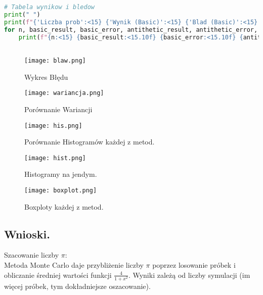 \documentclass[12pt,letterpaper]{article}
\theoremstyle{definition}
\begin{document}
\begin{lstlisting}[language=Python, caption=Skrypt do Zad 3.]
# Tabela wynikow i bledow
print(" ")
print(f"{'Liczba prob':<15} {'Wynik (Basic)':<15} {'Blad (Basic)':<15} {'Wynik (Antithetic)':<20} {'Blad (Antithetic)':<20} {'Wynik (Control Variate)':<25} {'Blad (Control Variate)':<25}")
for n, basic_result, basic_error, antithetic_result, antithetic_error, control_variate_result, control_variate_error in zip(n_values, basic_results, basic_errors, antithetic_results, antithetic_errors, control_variate_results, control_variate_errors):
    print(f"{n:<15} {basic_result:<15.10f} {basic_error:<15.10f} {antithetic_result:<20.10f} {antithetic_error:<20.10f} {control_variate_result:<25.10f} {control_variate_error:<25.10f}")



\end{lstlisting}

\begin{figure}[H]
			\centering

				\centering
				\texttt{[image: blaw.png]}
				\caption{Wykres Błędu}
				\label{fig:zdjecie1}
			\hfill
		\end{figure}
  
\begin{figure}[H]
			\centering

				\centering
				\texttt{[image: wariancja.png]}
				\caption{Porównanie Wariancji}
				\label{fig:zdjecie1}
			\hfill
		\end{figure}

\begin{figure}[H]
			\centering

				\centering
				\texttt{[image: his.png]}
				\caption{Porównanie Histogramów każdej z metod.}
				\label{fig:zdjecie1}
			\hfill
		\end{figure}
\begin{figure}[H]
			\centering

				\centering
				\texttt{[image: hist.png]}
				\caption{Histogramy na jendym.}
				\label{fig:zdjecie1}
			\hfill
		\end{figure}
\begin{figure}[H]
			\centering

				\centering
				\texttt{[image: boxplot.png]}
				\caption{Boxploty każdej z metod.}
				\label{fig:zdjecie1}
			\hfill
		\end{figure}

\subsection{Wnioski.}
Szacowanie liczby $\pi$:\\
Metoda Monte Carlo daje przybliżenie liczby $\pi$ poprzez losowanie próbek i obliczanie średniej wartości funkcji $\frac{4}{1+x^2}.$ Wyniki zależą od liczby symulacji (im więcej próbek, tym dokładniejsze oszacowanie).\\
\end{document}

